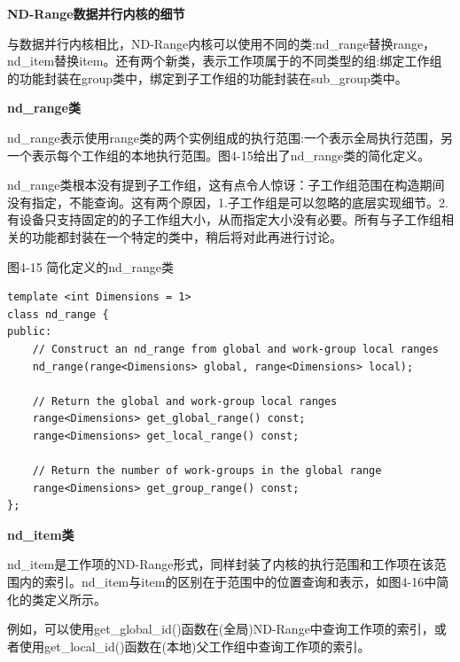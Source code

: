 \hspace*{\fill} \par %
\textbf{ND-Range数据并行内核的细节}

与数据并行内核相比，ND-Range内核可以使用不同的类:nd\_range替换range，nd\_item替换item。还有两个新类，表示工作项属于的不同类型的组:绑定工作组的功能封装在group类中，绑定到子工作组的功能封装在sub\_group类中。\par

\hspace*{\fill} \par %
\textbf{nd\_range类}

nd\_range表示使用range类的两个实例组成的执行范围:一个表示全局执行范围，另一个表示每个工作组的本地执行范围。图4-15给出了nd\_range类的简化定义。\par

nd\_range类根本没有提到子工作组，这有点令人惊讶：子工作组范围在构造期间没有指定，不能查询。这有两个原因，1.子工作组是可以忽略的底层实现细节。2.有设备只支持固定的的子工作组大小，从而指定大小没有必要。所有与子工作组相关的功能都封装在一个特定的类中，稍后将对此再进行讨论。\par

\hspace*{\fill} \par %
图4-15 简化定义的nd\_range类
\begin{lstlisting}[caption={}]
template <int Dimensions = 1>
class nd_range {
public:
	// Construct an nd_range from global and work-group local ranges
	nd_range(range<Dimensions> global, range<Dimensions> local);
	
	// Return the global and work-group local ranges
	range<Dimensions> get_global_range() const;
	range<Dimensions> get_local_range() const;
	
	// Return the number of work-groups in the global range
	range<Dimensions> get_group_range() const;
};
\end{lstlisting}

\hspace*{\fill} \par %
\textbf{nd\_item类}

nd\_item是工作项的ND-Range形式，同样封装了内核的执行范围和工作项在该范围内的索引。nd\_item与item的区别在于范围中的位置查询和表示，如图4-16中简化的类定义所示。\par

例如，可以使用get\_global\_id()函数在(全局)ND-Range中查询工作项的索引，或者使用get\_local\_id()函数在(本地)父工作组中查询工作项的索引。\par

